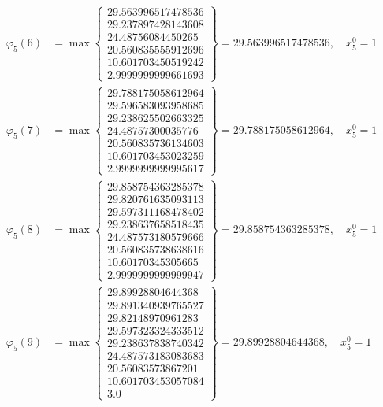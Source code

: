 \documentclass{article}
\begin{document}
\begin{align*}
  
\varphi_{5}(6) &= \max \left\{ \begin{array}{c}
29.563996517478536 \\
 29.237897428143608 \\
 24.48756084450265 \\
 20.560835555912696 \\
 10.601703450519242 \\
 2.9999999999661693
\end{array} \right\} = 29.563996517478536, \quad x_{5}^0 = 1\\
  
  
  
  
\varphi_{5}(7) &= \max \left\{ \begin{array}{c}
29.788175058612964 \\
 29.596583093958685 \\
 29.238625502663325 \\
 24.48757300035776 \\
 20.560835736134603 \\
 10.601703453023259 \\
 2.9999999999995617
\end{array} \right\} = 29.788175058612964, \quad x_{5}^0 = 1\\
  
  
  
  
\varphi_{5}(8) &= \max \left\{ \begin{array}{c}
29.858754363285378 \\
 29.820761635093113 \\
 29.597311168478402 \\
 29.238637658518435 \\
 24.487573180579666 \\
 20.560835738638616 \\
 10.60170345305665 \\
 2.9999999999999947
\end{array} \right\} = 29.858754363285378, \quad x_{5}^0 = 1\\
  
  
  
  
\varphi_{5}(9) &= \max \left\{ \begin{array}{c}
29.89928804644368 \\
 29.891340939765527 \\
 29.82148970961283 \\
 29.597323324333512 \\
 29.238637838740342 \\
 24.487573183083683 \\
 20.56083573867201 \\
 10.601703453057084 \\
 3.0
\end{array} \right\} = 29.89928804644368, \quad x_{5}^0 = 1\\
  

\end{align*}
\end{document}
